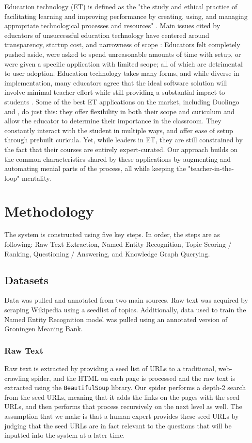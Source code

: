 \documentclass[11pt,a4paper]{article}
\begin{document}
Education technology (ET) is defined as the "the study and ethical practice of facilitating learning and improving performance by creating, using, and managing appropriate technological processes and resources" \cite{hlynka_jacobsen}. Main issues cited by educators of unsuccessful education technology have centered around transparency, startup cost, and narrowness of scope \cite{TODO}: Educators felt completely pushed aside, were asked to spend unreasonable amounts of time with setup, or were given a specific application with limited scope; all of which are detrimental to user adoption. Education technology takes many forms, and while diverse in implementation, many educators agree that the ideal software solution will involve minimal teacher effort while still providing a substantial impact to students \cite{norris_soloway02/12/18}. Some of the best ET applications on the market, including Duolingo and \cite{!!!textbook websiteTODO}, do just this: they offer flexibility in both their scope and curiculum and allow the educator to determine their importance in the classroom. They constantly interact with the student in multiple ways, and offer ease of setup through prebuilt curicula. Yet, while leaders in ET, they are still constrained by the fact that their courses are entirely expert-curated. Our approach builds on the common characteristics shared by these applications by augmenting and automating menial parts of the process, all while keeping the "teacher-in-the-loop" mentality.

\section{Methodology}
The system is constructed using five key steps. In order, the steps are as following: Raw Text Extraction, Named Entity Recognition, Topic Scoring / Ranking, Questioning / Answering, and Knowledge Graph Querying.

\subsection{Datasets}
Data was pulled and annotated from two main sources. Raw text was acquired by scraping Wikipedia using a seedlist of topics. Additionally, data used to train the Named Entity Recognition model was pulled using an annotated version of Groningen Meaning Bank. 

\subsubsection{Raw Text}\label{data_raw_text}
Raw text is extracted by providing a seed list of URLs to a traditional, web-crawling spider, and the HTML on each page is processed and the raw text is extracted using the \texttt{BeautifulSoup} library. Our spider performs a depth-2 search from the seed URLs, meaning that it adds the links on the pages with the seed URLs, and then performs that process recursively on the next level as well. The assumption that we make is that a human expert provides these seed URLs by judging that the seed URLs are in fact relevant to the questions that will be inputted into the system at a later time.
\end{document}
